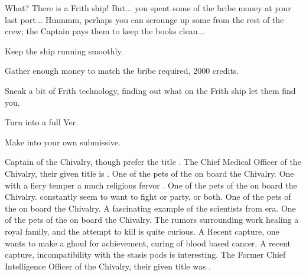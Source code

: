\documentclass[char]{guildcamp4}
\begin{document}
What? There is a Frith ship! But... you spent some of the bribe money at your last port... Hmmmm, perhaps you can scrounge up some from the rest of the crew; the Captain pays them to keep the books clean...

\begin{itemz}[Goals]
	\item Keep the ship running smoothly.
	\item Gather enough money to match the bribe required, 2000 credits.
	\item Sneak a bit of Frith technology, finding out what on the Frith ship let them find you.
	\item Turn \cJulie{} into a full Ver.
	\item Make \cJulie{} into your own submissive.
\end{itemz}

\begin{contacts}
	\contact{\cVone{}} Captain of the Chivalry, though \cVone{\they} prefer the title \cVone{\Duke}.
	\contact{\cVthree{}}The Chief Medical Officer of the Chivalry, their given title is \cVtwo{\Baron}.
	\contact{\cJoan{}} One of the pets of the \cVone{\Duke} on board the Chivalry. One with a fiery temper a much religious fervor .
	\contact{\cJulie{}} One of the pets of the \cVone{\Duke} on board the Chivalry. \cJulie{\they} constantly seem to want to fight or party, or both.
	\contact{\cJames{}} One of the pets of the \cVone{\Duke} on board the Chivalry. A fascinating example of the scientists from \cJames{\their} era.
	\contact{\cRasputin{}} One of the pets of the \cVone{\Duke} on board the Chivalry. The rumors surrounding \cRasputin{\their} work healing a royal family, and the attempt to kill \cRasputin{\them} is quite curious.
	\contact{\cSpite{}} A Recent capture, one \cVone{} wants to make a ghoul for \cSpite{\their} achievement, curing of blood based cancer.
	\contact{\cPlead{}} A recent capture, \cPlead{\their} incompatibility with the stasis pods is interesting.
	\contact{\cIntel{}} The Former Chief Intelligence Officer of the Chivalry, their given title was \cIntel{\Count}.
\end{contacts}
\end{document}
